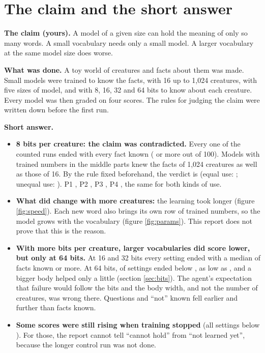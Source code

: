 \section{The claim and the short answer}\label{sec:claim}

\textbf{The claim (yours).} A model of a given size can hold the meaning of only so many words.
A small vocabulary needs only a small model. A larger vocabulary at the same model size does
worse.

\textbf{What was done.} A toy world of creatures and facts about them was made. Small models
were trained to know the facts, with 16 up to 1,024 creatures, with five sizes of model, and
with 8, 16, 32 and 64 bits to know about each creature. Every model was then graded on four
scores. The rules for judging the claim were written down before the first run.

\begin{keybox}
\textbf{Short answer.}
\begin{itemize}
\item \textbf{8 bits per creature: the claim was contradicted.} Every one of the 
  counted runs ended with every fact known ( or more out of 100).
  Models with  trained numbers in the middle parts knew the
  facts of 1,024 creatures as well as those of 16. By the rule fixed beforehand, the verdict is
  \textbf{} (equal use: ; unequal use: ).
  P1 , P2 , P3 , P4
  , the same for both kinds of use.
\item \textbf{What did change with more creatures:} the learning took longer (figure
  \ref{fig:speed}). Each new word also brings its own row of  trained numbers,
  so the model grows with the vocabulary (figure \ref{fig:params}). This report does not prove
  that this is the reason.
\item \textbf{With more bits per creature, larger vocabularies did score lower, but only at 64
  bits.} At 16 and 32 bits every setting ended with a median of  facts known or more.
  At 64 bits,  of  settings ended below , as low as
  , and a bigger body helped only a little (section \ref{sec:bits}). The agent's
  expectation that failure would follow the bits and the body width, and not the number of creatures, was
  wrong there. Questions and ``not'' known fell earlier and further than facts known.
\item \textbf{Some scores were still rising when training stopped} (all  settings below ). For those, the report
  cannot tell ``cannot hold'' from ``not learned yet'', because the longer control run
  was not done.
\end{itemize}
\end{keybox}

